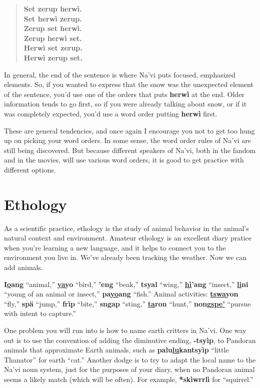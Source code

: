 \documentclass[nofonts]{tufte-handout}
\newcommand{\N}[1]{\textbf{\textcolor{navi}{#1}}}
\begin{document}
\begin{quotation}
  \noindent\N{Set zerup herwì.} \\
  \noindent\N{Set herwì zerup.} \\
  \noindent\N{Zerup set herwì.} \\
  \noindent\N{Zerup herwì set.} \\
  \noindent\N{Herwì set zerup.} \\
  \noindent\N{Herwì zerup set.}
\end{quotation}

\noindent In general, the end of the sentence is where Na'vi puts
focused, emphasized elements.  So, if you wanted to express that the
snow was the unexpected element of the sentence, you'd use one of the
orders that puts \N{herwì} at the end.  Older information
tends to go first, so if you were already talking about snow, or if it
was completely expected, you'd use a word order putting \N{herwì}
first.

These are general tendencies, and once again I encourage you not to
get too hung up on picking your word orders.  In some sense, the word
order rules of Na'vi are still being discovered.  But because
different speakers of Na'vi, both in the fandom and in the movies,
will use various word orders, it is good to get practice with
different options.


\section*{Ethology}
As a scientific practice, ethology is the study of animal behavior in
the animal's natural context and environment.  Amateur ethology is an
excellent diary pratice when you're learning a new language, and it
helps to connect you to the environment you live in.  We've already
been tracking the weather.  Now we can add animals.

\N{I\uline{o}ang} ``animal,'' \N{\uline{ya}yo} ``bird,'' \N{'eng}
``beak,'' \N{tsyal} ``wing,'' \N{\uline{hì}'ang} ``insect,''
\N{\uline{li}ni} ``young of an animal or insect,'' \N{pa\uline{yo}ang}
``fish.''  Animal activities: \N{\uline{tswa}yon} ``fly,'' \N{spä}
``jump,'' \N{frìp} ``bite,'' \N{sngap} ``sting,'' \N{\uline{ta}ron}
``hunt,'' \N{nong\uline{spe'}} ``pursue with intent to capture.''

One problem you will run into is how to name earth critters in Na'vi.
One way out is to use the convention of adding the diminutive ending,
\N{-tsyìp}, to Pandoran animals that approximate Earth animals, such
as \N{palu\uline{lu}kantsyìp} ``little Thanator'' for earth ``cat.''
Another dodge is to try to adapt the local name to the Na'vi noun
system, just for the purposes of your diary, when no Pandoran animal
seems a likely match (which will be often).  For example,
\marginnote{That asterisk, \N{*skìwrrlì}, means I made this word up.}
\N{*skìwrrlì} for ``squirrel.'' 
\end{document}
